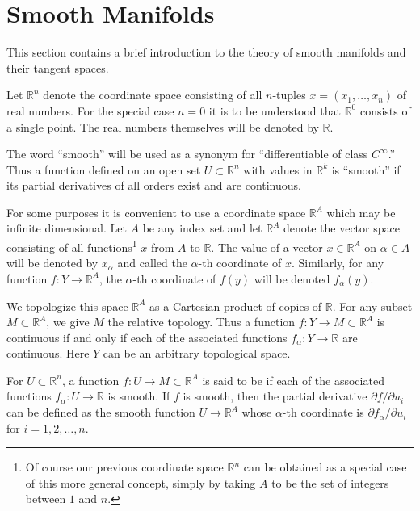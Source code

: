 \documentclass[../main]{subfiles}
\begin{document}
\chapter{Smooth Manifolds}\label{ch:1}
This section contains a brief introduction to the theory of smooth manifolds and their tangent spaces.

Let ${\mathbb R}^n$ denote the coordinate space consisting of all $n$-tuples $x = (x_1, \ldots, x_n)$ of real numbers. For the special case $n = 0$ it is to be understood that ${\mathbb R}^0$ consists of a single point. The real numbers themselves will be denoted by $\mathbb R$. 

The word ``smooth'' will be used as a synonym for ``differentiable of class $C^\infty$.'' Thus a function defined on an open set $U \subset {\mathbb R}^n$ with values in ${\mathbb R}^k$ is ``smooth'' if its partial derivatives of all orders exist and are continuous.

For some purposes it is convenient to use a coordinate space ${\mathbb R}^A$ which may be infinite dimensional. Let $A$ be any index set and let ${\mathbb R}^A$ denote the vector space consisting of all functions\footnote{Of course our previous coordinate space ${\mathbb R}^n$ can be obtained as a special case of this more general concept, simply by taking $A$ to be the set of integers between $1$ and $n$.} $x$ from $A$ to $\mathbb R$. The value of a vector $x \in {\mathbb R}^A$ on $\alpha \in A$ will be denoted by $x_\alpha$ and called the $\alpha$-th coordinate of $x$. Similarly, for any function $f : Y \longrightarrow {\mathbb R}^A$, the $\alpha$-th coordinate of $f(y)$ will be denoted $f_\alpha(y)$. 

We topologize this space ${\mathbb R}^A$ as a Cartesian product of copies of $\mathbb R$. For any subset $M \subset {\mathbb R}^A$, we give $M$ the relative topology. Thus a function \newline $f : Y \longrightarrow M \subset {\mathbb R}^A$ is continuous if and only if each of the associated functions $f_\alpha : Y \longrightarrow \mathbb R$ are continuous. Here $Y$ can be an arbitrary topological space. 

\begin{definition}
For $U \subset {\mathbb R}^n$, a function $f : U \longrightarrow M \subset {\mathbb R}^A$ is said to be  if each of the associated functions $f_\alpha : U \longrightarrow \mathbb R$ is smooth. If $f$ is smooth, then the partial derivative $\partial f/\partial u_i$ can be defined as the smooth function $U \longrightarrow {\mathbb R}^A$ whose $\alpha$-th coordinate is $\partial f_\alpha/\partial u_i$ for $i = 1, 2, \ldots, n$. 
\end{definition}
\end{document}
